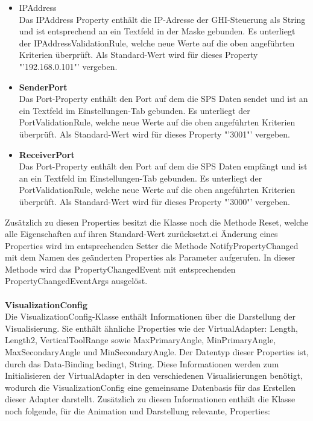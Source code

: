 \begin{itemize}
\item IPAddress\\
Das IPAddress Property enthält die IP-Adresse der GHI-Steuerung als String und ist entsprechend an ein Textfeld in der Maske gebunden. Es unterliegt der IPAddressValidationRule, welche neue Werte auf die oben angeführten Kriterien überprüft. Als Standard-Wert wird für dieses Property "'192.168.0.101"' vergeben.
\item \textbf{SenderPort}\\
Das Port-Property enthält den Port auf dem die SPS Daten sendet und ist an ein Textfeld im Einstellungen-Tab gebunden. Es unterliegt der PortValidationRule,  welche neue Werte auf die oben angeführten Kriterien überprüft. Als Standard-Wert wird für dieses Property "'3001"' vergeben.
\item \textbf{ReceiverPort}\\
Das Port-Property enthält den Port auf dem die SPS Daten empfängt  und ist an ein Textfeld im Einstellungen-Tab gebunden. Es unterliegt der PortValidationRule,  welche neue Werte auf die oben angeführten Kriterien überprüft. Als Standard-Wert wird für dieses Property "'3000"' vergeben.
\end{itemize}
Zusätzlich zu diesen Properties besitzt die Klasse noch die Methode Reset, welche alle Eigenschaften auf ihren Standard-Wert zurücksetzt.ei Änderung eines Properties wird im entsprechenden Setter die Methode NotifyPropertyChanged mit dem Namen des geänderten Properties als Parameter aufgerufen. In dieser Methode wird das PropertyChangedEvent mit entsprechenden PropertyChangedEventArgs ausgelöst.\\
\\
\textbf{VisualizationConfig}\\
Die VisualizationConfig-Klasse enthält Informationen über die Darstellung der Visualisierung. Sie enthält ähnliche Properties wie der VirtualAdapter: Length, Length2, VerticalToolRange sowie MaxPrimaryAngle, MinPrimaryAngle, MaxSecondaryAngle und MinSecondaryAngle. Der Datentyp dieser Properties ist, durch das Data-Binding bedingt, String. Diese Informationen werden zum Initialisieren der VirtualAdapter in den verschiedenen Visualisierungen benötigt, wodurch die VisualizationConfig  eine gemeinsame Datenbasis für das Erstellen dieser Adapter darstellt.
Zusätzlich zu diesen Informationen enthält die Klasse noch folgende, für die Animation und Darstellung relevante, Properties:
